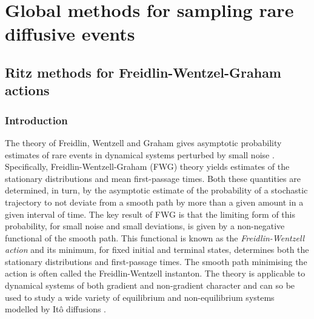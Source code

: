 \part{Global methods for sampling rare diffusive events}

\chapter{Ritz methods for Freidlin-Wentzel-Graham actions} \label{ch:Ritz methods for Freidlin-Wentzel-Graham actions}

\section{Introduction}

The theory of Freidlin, Wentzell and Graham \citep{ventselSMALLRANDOMPERTURBATIONS1970, graham1973statistical,graham1987macroscopic}
gives asymptotic probability estimates of rare events in dynamical
systems perturbed by small noise \citep{bolhuis2002transition, allen2005sampling, allen2009forward, ebener2019instanton}.
Specifically, Freidlin-Wentzell-Graham (FWG) theory yields estimates of the stationary
distributions and mean first-passage times. Both these quantities
are determined, in turn, by the asymptotic estimate of the probability
of a stochastic trajectory to not deviate from a smooth path by more
than a given amount in a given interval of time. The key result of
FWG is that the limiting form of this probability,
for small noise and small deviations, is given by a non-negative functional
of the smooth path. This functional is known as the \textit{Freidlin-Wentzell action} and its minimum, for fixed initial and terminal states, determines
both the stationary distributions and first-passage times. The smooth
path minimising the action is often called the Freidlin-Wentzell instanton.
The theory is applicable to dynamical systems of both gradient and
non-gradient character and can so be used to study a wide variety
of equilibrium and non-equilibrium systems modelled by Itô diffusions
\citep{paninski2006most,huang2012molecular, bouchet2016generalisation, maier1996scaling, wolynes1995navigating, noltingBallsCupsQuasipotentials2016, mangel1994barrier, gardner2000construction, demarco2001phase, nelson1987stochastic}.

